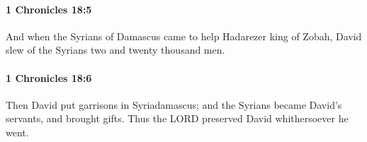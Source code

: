 		\paragraph{1 Chronicles 18:5} %
			\label{1CHRONICLES-18-5}

			And when the Syrians of Damascus came to help Hadarezer king of Zobah, David slew of the Syrians two and twenty thousand men.


		\paragraph{1 Chronicles 18:6} %
			\label{1CHRONICLES-18-6}

			Then David put garrisons in Syriadamascus; and the Syrians became David’s servants, and brought gifts. Thus the LORD preserved David whithersoever he went.


